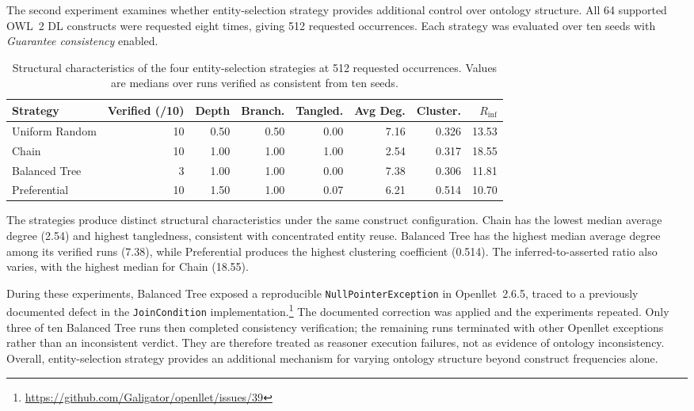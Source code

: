 The second experiment examines whether entity-selection strategy provides
additional control over ontology structure. All 64 supported OWL~2 DL
constructs were requested eight times, giving 512 requested occurrences.
Each strategy was evaluated over ten seeds with \emph{Guarantee consistency}
enabled.

\begin{table}[htbp]
\centering
\caption{Structural characteristics of the four entity-selection strategies
at 512 requested occurrences. Values are medians over runs verified as
consistent from ten seeds.}
\label{tab:strategy-comparison}
\small
\setlength{\tabcolsep}{2pt}
\begin{tabular}{lrrrrrrr}
\toprule
Strategy & Verified (/10) & Depth & Branch. & Tangled. &
Avg Deg. & Cluster. & $R_{\mathrm{inf}}$ \\
\midrule
Uniform Random & 10 & 0.50 & 0.50 & 0.00 & 7.16 & 0.326 & 13.53 \\
Chain          & 10 & 1.00 & 1.00 & 1.00 & 2.54 & 0.317 & 18.55 \\
Balanced Tree  & 3  & 1.00 & 1.00 & 0.00 & 7.38 & 0.306 & 11.81 \\
Preferential   & 10 & 1.50 & 1.00 & 0.07 & 6.21 & 0.514 & 10.70 \\
\bottomrule
\end{tabular}
\end{table}

The strategies produce distinct structural characteristics under the same
construct configuration. Chain has the lowest median average degree (2.54)
and highest tangledness, consistent with concentrated entity reuse. Balanced
Tree has the highest median average degree among its verified runs (7.38),
while Preferential produces the highest clustering coefficient (0.514).
The inferred-to-asserted ratio also varies, with the highest median for
Chain (18.55).

During these experiments, Balanced Tree exposed a reproducible
\texttt{NullPointerException} in Openllet~2.6.5, traced to a previously
documented defect in the \texttt{JoinCondition}
implementation.\footnote{\url{https://github.com/Galigator/openllet/issues/39}}
The documented correction was applied and the experiments repeated. Only
three of ten Balanced Tree runs then completed consistency verification; the
remaining runs terminated with other Openllet exceptions rather than an
inconsistent verdict. They are therefore treated as reasoner execution
failures, not as evidence of ontology inconsistency. Overall, entity-selection
strategy provides an additional mechanism for varying ontology structure
beyond construct frequencies alone.


